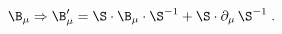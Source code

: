 \begin{equation}
\label{e5:19}
\B_{\mu} \Rightarrow \B_{\mu}'=\S \cdot \B_{\mu} \cdot \S^{-1} + \S \cdot \partial_{\mu} \, \S^{-1} \; .
\end{equation}\
